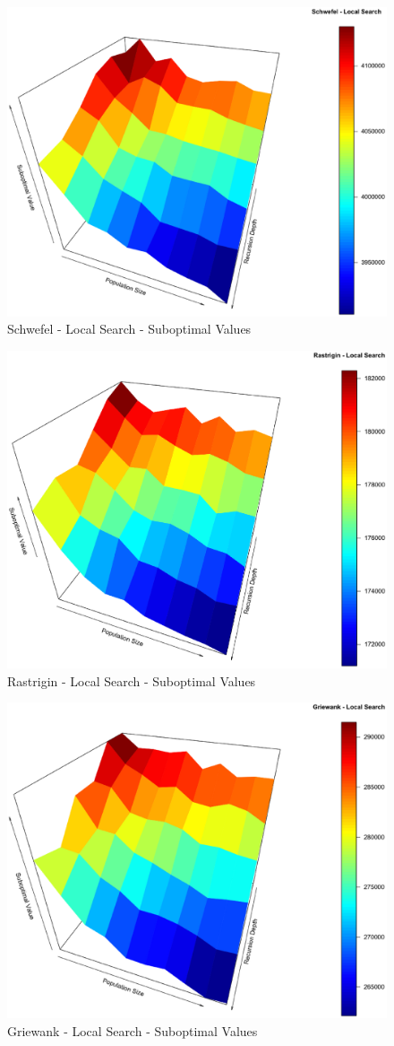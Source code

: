 \documentclass[conference]{IEEEtran}
\begin{document}
\begin{figure}[tbp]
\centering
\includegraphics[width=1.0\hsize,height=0.65\hsize]{fig09.eps}
\caption{Schwefel - Local Search - Suboptimal Values}
\label{fig03}
\end{figure}

\begin{figure}[tbp]
\centering
\includegraphics[width=1.0\hsize,height=0.65\hsize]{fig12.eps}
\caption{Rastrigin - Local Search - Suboptimal Values}
\label{fig04}
\end{figure}

\begin{figure}[tbp]
\centering
\includegraphics[width=1.0\hsize,height=0.65\hsize]{fig15.eps}
\caption{Griewank - Local Search - Suboptimal Values}
\label{fig05}
\end{figure}
\end{document}
